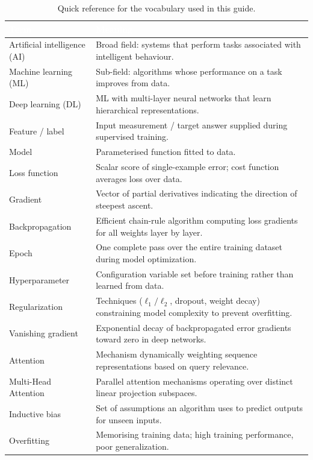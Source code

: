 \documentclass[11pt,a4paper]{article}
\begin{document}
	\begin{table}[ht]
		\centering
		\small\sffamily
		\renewcommand{\arraystretch}{1.25}
		\caption{Quick reference for the vocabulary used in this guide.}
		\begin{tabular}{@{}L{3.8cm} L{10.8cm}@{}}
			\toprule
			\textcolor{white}{\textbf{Term}} & \textcolor{white}{\textbf{Meaning}} \\
			\midrule
			Artificial intelligence (AI) & Broad field: systems that perform tasks associated with intelligent behaviour. \\
			Machine learning (ML) & Sub-field: algorithms whose performance on a task improves from data. \\
			Deep learning (DL) & ML with multi-layer neural networks that learn hierarchical representations. \\
			Feature / label & Input measurement / target answer supplied during supervised training. \\
			Model & Parameterised function fitted to data. \\
			Loss function & Scalar score of single-example error; cost function averages loss over data. \\
			Gradient & Vector of partial derivatives indicating the direction of steepest ascent. \\
			Backpropagation & Efficient chain-rule algorithm computing loss gradients for all weights layer by layer. \\
			Epoch & One complete pass over the entire training dataset during model optimization. \\
			Hyperparameter & Configuration variable set before training rather than learned from data. \\
			Regularization & Techniques ($\ell_1/\ell_2$, dropout, weight decay) constraining model complexity to prevent overfitting. \\
			Vanishing gradient & Exponential decay of backpropagated error gradients toward zero in deep networks. \\
			Attention & Mechanism dynamically weighting sequence representations based on query relevance. \\
			Multi-Head Attention & Parallel attention mechanisms operating over distinct linear projection subspaces. \\
			Inductive bias & Set of assumptions an algorithm uses to predict outputs for unseen inputs. \\
			Overfitting & Memorising training data; high training performance, poor generalization. \\

\end{tabular}
\end{table}
\end{document}
